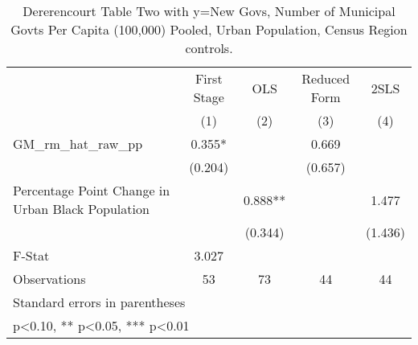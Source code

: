 \begin{table}[htbp]\centering
\def\sym#1{\ifmmode^{#1}\else\(^{#1}\)\fi}
\caption{Dererencourt Table Two with y=New Govs, Number of Municipal Govts Per Capita (100,000) Pooled, Urban Population, Census Region controls.}
\begin{tabular}{l*{4}{c}}
\toprule
                    & First Stage   &         OLS   &Reduced Form   &        2SLS   \\
                    &\multicolumn{1}{c}{(1)}   &\multicolumn{1}{c}{(2)}   &\multicolumn{1}{c}{(3)}   &\multicolumn{1}{c}{(4)}   \\
\midrule
GM\_rm\_hat\_raw\_pp    &       0.355*  &               &       0.669   &               \\
                    &     (0.204)   &               &     (0.657)   &               \\
\addlinespace
Percentage Point Change in Urban Black Population&               &       0.888** &               &       1.477   \\
                    &               &     (0.344)   &               &     (1.436)   \\
\midrule
F-Stat              &       3.027   &               &               &               \\
Observations        &          53   &          73   &          44   &          44   \\
\bottomrule
\multicolumn{5}{l}{\footnotesize Standard errors in parentheses}\\
\multicolumn{5}{l}{\footnotesize * p<0.10, ** p<0.05, *** p<0.01}\\
\end{tabular}
\end{table}
